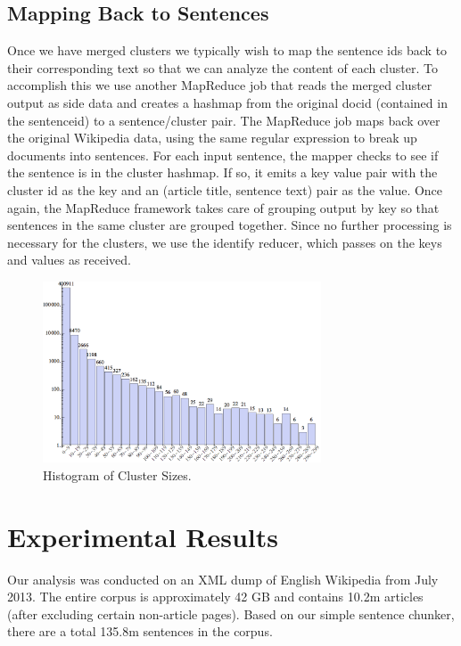 \documentclass[letterpaper]{article}
\begin{document}
\subsection{Mapping Back to Sentences}

Once we have merged clusters we typically wish to map the sentence ids
back to their corresponding text so that we can analyze the content of
each cluster. To accomplish this we use another MapReduce job that
reads the merged cluster output as side data and creates a hashmap
from the original docid (contained in the sentenceid) to a
sentence/cluster pair. The MapReduce job maps back over the original
Wikipedia data, using the same regular expression to break up
documents into sentences. For each input sentence, the mapper checks
to see if the sentence is in the cluster hashmap. If so, it emits a
key value pair with the cluster id as the key and an (article title,
sentence text) pair as the value. Once again, the MapReduce framework
takes care of grouping output by key so that sentences in the same
cluster are grouped together. Since no further processing is necessary
for the clusters, we use the identify reducer, which passes on the
keys and values as received.

\begin{figure}
\centering
\includegraphics[width=3.25in, keepaspectratio = true]{clusterhistogram.png}
\caption{Histogram of Cluster Sizes.}
\label{params}
\end{figure}

\section{Experimental Results}

Our analysis was conducted on an XML dump of English Wikipedia from
July 2013. The entire corpus is approximately 42 GB and contains 10.2m
articles (after excluding certain non-article pages). Based on our
simple sentence chunker, there are a total 135.8m sentences in the
corpus.
\end{document}
